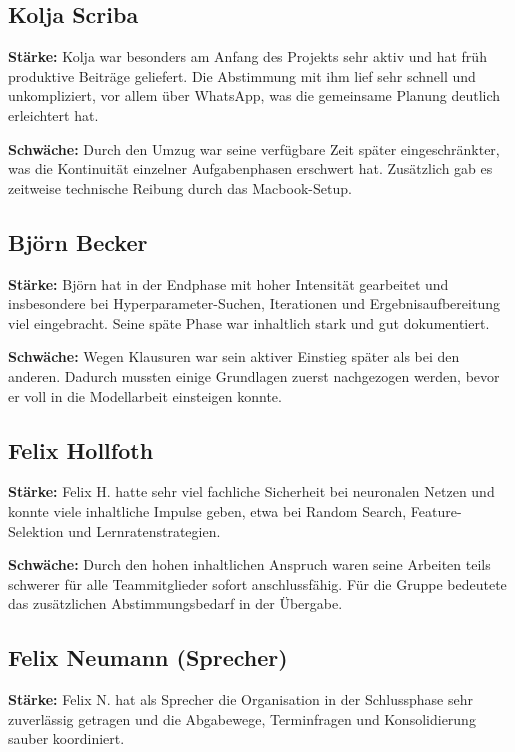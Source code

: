 \documentclass[9pt,a4paper,twocolumn,twoside]{tau-class/tau}
\begin{document}
\subsection*{Kolja Scriba}
\textbf{St\"arke:} Kolja war besonders am Anfang des Projekts sehr aktiv und hat fr\"uh produktive Beitr\"age geliefert. Die Abstimmung mit ihm lief sehr schnell und unkompliziert, vor allem \"uber WhatsApp, was die gemeinsame Planung deutlich erleichtert hat.

\textbf{Schw\"ache:} Durch den Umzug war seine verf\"ugbare Zeit sp\"ater eingeschr\"ankter, was die Kontinuit\"at einzelner Aufgabenphasen erschwert hat. Zus\"atzlich gab es zeitweise technische Reibung durch das Macbook-Setup.

\subsection*{Bj\"orn Becker}
\textbf{St\"arke:} Bj\"orn hat in der Endphase mit hoher Intensit\"at gearbeitet und insbesondere bei Hyperparameter-Suchen, Iterationen und Ergebnisaufbereitung viel eingebracht. Seine sp\"ate Phase war inhaltlich stark und gut dokumentiert.

\textbf{Schw\"ache:} Wegen Klausuren war sein aktiver Einstieg sp\"ater als bei den anderen. Dadurch mussten einige Grundlagen zuerst nachgezogen werden, bevor er voll in die Modellarbeit einsteigen konnte.

\subsection*{Felix Hollfoth}
\textbf{St\"arke:} Felix H. hatte sehr viel fachliche Sicherheit bei neuronalen Netzen und konnte viele inhaltliche Impulse geben, etwa bei Random Search, Feature-Selektion und Lernratenstrategien.

\textbf{Schw\"ache:} Durch den hohen inhaltlichen Anspruch waren seine Arbeiten teils schwerer f\"ur alle Teammitglieder sofort anschlussf\"ahig. F\"ur die Gruppe bedeutete das zus\"atzlichen Abstimmungsbedarf in der \"Ubergabe.

\subsection*{Felix Neumann (Sprecher)}
\textbf{St\"arke:} Felix N. hat als Sprecher die Organisation in der Schlussphase sehr zuverl\"assig getragen und die Abgabewege, Terminfragen und Konsolidierung sauber koordiniert.
\end{document}

